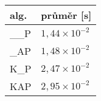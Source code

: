 \begin{tabular}{@{}ll@{}}
    \hline
alg.  & průměr [s] \\\hline
\_\_P &$ 1{,}44  \times 10^{-2}$\\
\_AP &$ 1{,}48  \times 10^{-2}$\\
K\_P &$ 2{,}47  \times 10^{-2}$\\
KAP &$ 2{,}95  \times 10^{-2}$\\\hline
\end{tabular}%